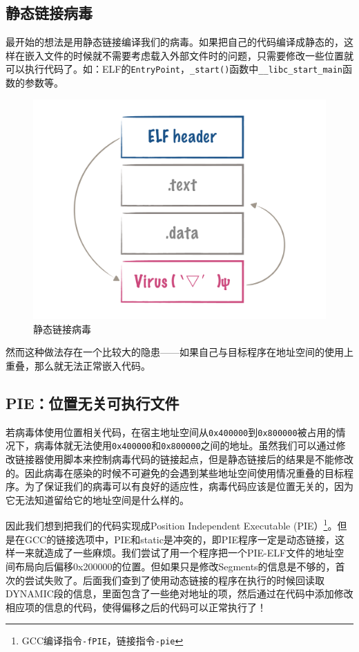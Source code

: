 \documentclass[a4paper, 11pt]{article}
\begin{document}
\subsection{静态链接病毒}
最开始的想法是用静态链接编译我们的病毒。如果把自己的代码编译成静态的，这样在嵌入文件的时候就不需要考虑载入外部文件时的问题，只需要修改一些位置就可以执行代码了。如：ELF的\texttt{EntryPoint}，\texttt{\_start()}函数中\texttt{\_\_libc\_start\_main}函数的参数等。
	\begin{figure}[htbp]
		\centering
		\includegraphics[width = \textwidth]{figures/fig1_order}
		\caption{静态链接病毒}
		\label{fig:way1}
	\end{figure}
然而这种做法存在一个比较大的隐患——如果自己与目标程序在地址空间的使用上重叠，那么就无法正常嵌入代码。
\subsection{PIE：位置无关可执行文件}
若病毒体使用位置相关代码，在宿主地址空间从\texttt{0x400000}到\texttt{0x800000}被占用的情况下，病毒体就无法使用\texttt{0x400000}和\texttt{0x800000}之间的地址。虽然我们可以通过修改链接器使用脚本来控制病毒代码的链接起点，但是静态链接后的结果是不能修改的。因此病毒在感染的时候不可避免的会遇到某些地址空间使用情况重叠的目标程序。为了保证我们的病毒可以有良好的适应性，病毒代码应该是位置无关的，因为它无法知道留给它的地址空间是什么样的。

因此我们想到把我们的代码实现成Position Independent Executable (PIE）\footnote{GCC编译指令\texttt{-fPIE}，链接指令\texttt{-pie}}。但是在GCC的链接选项中，PIE和static是冲突的，即PIE程序一定是动态链接，这样一来就造成了一些麻烦。我们尝试了用一个程序把一个PIE-ELF文件的地址空间布局向后偏移0x200000的位置。但如果只是修改Segments的信息是不够的，首次的尝试失败了。后面我们查到了使用动态链接的程序在执行的时候回读取DYNAMIC段的信息，里面包含了一些绝对地址的项，然后通过在代码中添加修改相应项的信息的代码，使得偏移之后的代码可以正常执行了！
\end{document}
